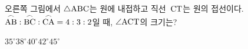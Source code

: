 \noindent\begin{minipage}[t]{0.58\linewidth}\vspace{0pt}\raggedright 오른쪽 그림에서 $\triangle\mathrm{ABC}$는 원에 내접하고 직선~$\mathrm{CT}$는 원의 접선이다. $\overset{\frown}{\mathrm{AB}}:\overset{\frown}{\mathrm{BC}}:\overset{\frown}{\mathrm{CA}}=4:3:2$일 때, $\angle\mathrm{ACT}$의 크기는?\end{minipage}\hfill\begin{minipage}[t]{0.4\linewidth}\vspace{0pt}\centering \resizebox{\ifdim\width>\linewidth\linewidth\else\width\fi}{!}{}\end{minipage}\par
\begin{choicesii}{$35^\circ$}{$38^\circ$}{$40^\circ$}{$42^\circ$}{$45^\circ$}\end{choicesii}

